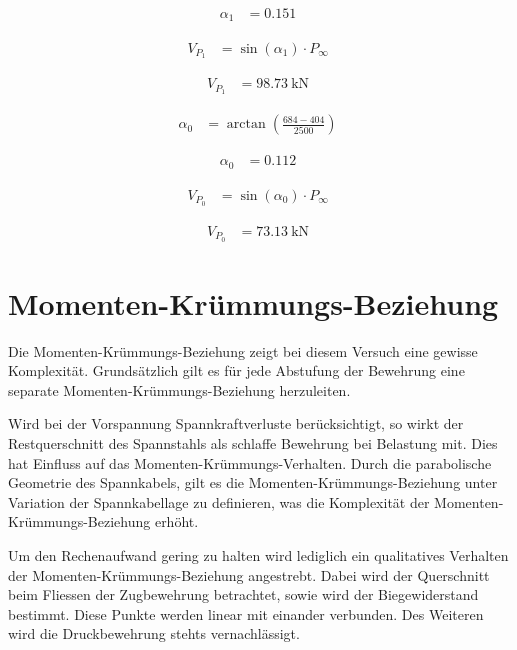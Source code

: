 \documentclass[
  11pt,
  letterpaper,
]{scrreprt}
\begin{document}
$$
\begin{aligned}
\alpha_{1} &= 0.151 \;
\end{aligned}
$$

$$
\begin{aligned}
V_{P_{1}} &= \sin \left( \alpha_{1} \right) \cdot P_{\infty} \; 
\end{aligned}
$$

$$
\begin{aligned}
V_{P_{1}} &= 98.73\ \mathrm{kN} \;
\end{aligned}
$$

$$
\begin{aligned}
\alpha_{0} &= \operatorname{arctan} { \left( \frac{ 684 - 404 }{ 2500 } \right) } \; 
\end{aligned}
$$

$$
\begin{aligned}
\alpha_{0} &= 0.112 \;
\end{aligned}
$$

$$
\begin{aligned}
V_{P_{0}} &= \sin \left( \alpha_{0} \right) \cdot P_{\infty} \; 
\end{aligned}
$$

$$
\begin{aligned}
V_{P_{0}} &= 73.13\ \mathrm{kN} \;
\end{aligned}
$$

\section{Momenten-Krümmungs-Beziehung}\label{momenten-kruxfcmmungs-beziehung}

Die Momenten-Krümmungs-Beziehung zeigt bei diesem Versuch eine gewisse
Komplexität. Grundsätzlich gilt es für jede Abstufung der Bewehrung eine
separate Momenten-Krümmungs-Beziehung herzuleiten.

Wird bei der Vorspannung Spannkraftverluste berücksichtigt, so wirkt der
Restquerschnitt des Spannstahls als schlaffe Bewehrung bei Belastung
mit. Dies hat Einfluss auf das Momenten-Krümmungs-Verhalten. Durch die
parabolische Geometrie des Spannkabels, gilt es die
Momenten-Krümmungs-Beziehung unter Variation der Spannkabellage zu
definieren, was die Komplexität der Momenten-Krümmungs-Beziehung erhöht.

Um den Rechenaufwand gering zu halten wird lediglich ein qualitatives
Verhalten der Momenten-Krümmungs-Beziehung angestrebt. Dabei wird der
Querschnitt beim Fliessen der Zugbewehrung betrachtet, sowie wird der
Biegewiderstand bestimmt. Diese Punkte werden linear mit einander
verbunden. Des Weiteren wird die Druckbewehrung stehts vernachlässigt.
\end{document}
